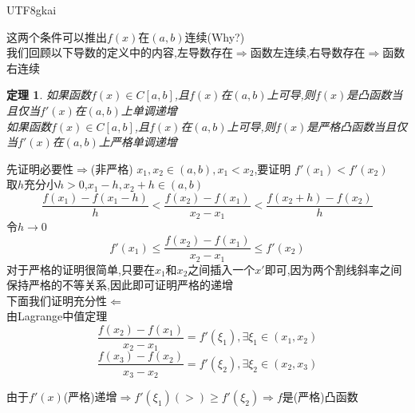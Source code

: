 \documentclass{article}
\newtheorem{theorem}{定理}[subsection]
\newenvironment{cproof}{%
\heiti{证明}\kaishu
}{%
}
\begin{document}
\begin{CJK}{UTF8}{gkai}
\begin{cproof}
\begin{center}
  \end{center}
这两个条件可以推出$f(x)$在$(a,b)$连续(Why?)\\
我们回顾以下导数的定义中的内容,左导数存在$\Rightarrow$函数左连续,右导数存在$\Rightarrow$函数右连续\\
\end{cproof}
\begin{theorem}
如果函数$f(x)\in C[a,b]$,且$f(x)$在$(a,b)$上可导,则$f(x)$是凸函数当且仅当$f'(x)$在$(a,b)$上单调递增\\

如果函数$f(x)\in C[a,b]$,且$f(x)$在$(a,b)$上可导,则$f(x)$是严格凸函数当且仅当$f'(x)$在$(a,b)$上严格单调递增\\
\end{theorem}
\begin{cproof}
先证明必要性$\Rightarrow$(非严格)
$x_1,x_2 \in(a,b),x_1 < x_2 $,要证明 $f'(x_1) < f'(x_2)$\\
取$h$充分小$h>0$,$x_1-h , x_2 + h \in (a,b)$\\
\[\dfrac{f(x_1) - f(x_1 - h)}{h} < \dfrac{f(x_2) - f(x_1)}{x_2 - x_1} < \dfrac{f(x_2 + h) - f(x_2)}{h}\]
令$h\to 0$\\
\[f'(x_1) \leq \dfrac{f(x_2) - f(x_1)}{x_2 - x_1} \leq f'(x_2)\]
对于严格的证明很简单,只要在$x_1和x_2$之间插入一个$x'$即可,因为两个割线斜率之间保持严格的不等关系,因此即可证明严格的递增\\

下面我们证明充分性$\Leftarrow$\\

由Lagrange中值定理
\[\dfrac{f(x_2) - f(x_1)}{x_2 - x_1} = f'(\xi_1) ,\exists\xi_1 \in (x_1,x_2)\]
\[\dfrac{f(x_3) - f(x_2)}{x_3 - x_2} = f'(\xi_2) ,\exists\xi_2 \in (x_2,x_3)\]

由于$f'(x)$(严格)递增$\Rightarrow f'(\xi_1) (>) \geq f'(\xi_2)\Rightarrow f$是(严格)凸函数\\


\end{cproof}
\end{CJK}
\end{document}
